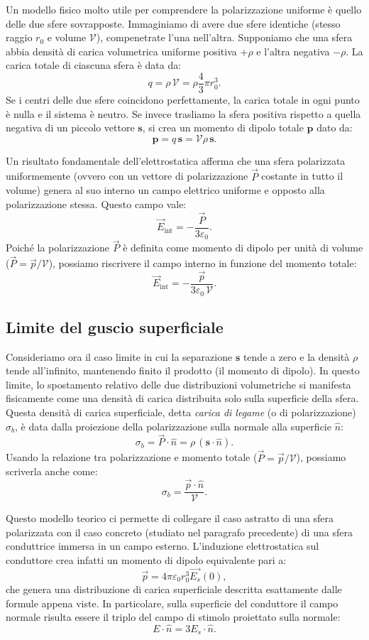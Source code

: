 \documentclass{book}
\begin{document}
Un modello fisico molto utile per comprendere la polarizzazione uniforme è quello delle due sfere sovrapposte.
Immaginiamo di avere due sfere identiche (stesso raggio $r_0$ e volume $\mathcal{V}$), compenetrate l'una nell'altra. Supponiamo che una sfera abbia densità di carica volumetrica uniforme positiva $+\rho$ e l'altra negativa $-\rho$.
La carica totale di ciascuna sfera è data da:
\[
q=\rho\,\mathcal{V}=\rho\frac{4}{3}\pi r_0^3.
\]
Se i centri delle due sfere coincidono perfettamente, la carica totale in ogni punto è nulla e il sistema è neutro. Se invece trasliamo la sfera positiva rispetto a quella negativa di un piccolo vettore $\mathbf{s}$, si crea un momento di dipolo totale $\mathbf{p}$ dato da:
\[
\mathbf{p} = q\,\mathbf{s} = \mathcal{V}\rho\,\mathbf{s}.
\]

Un risultato fondamentale dell'elettrostatica afferma che una sfera polarizzata uniformemente (ovvero con un vettore di polarizzazione $\vec{P}$ costante in tutto il volume) genera al suo interno un campo elettrico uniforme e opposto alla polarizzazione stessa. Questo campo vale:
\[
\vec{E}_{\text{int}} = -\frac{\vec{P}}{3\varepsilon_0}.
\]
Poiché la polarizzazione $\vec{P}$ è definita come momento di dipolo per unità di volume ($\vec{P} = \vec{p}/\mathcal{V}$), possiamo riscrivere il campo interno in funzione del momento totale:
\[
\vec{E}_{\text{int}} = -\frac{\vec{p}}{3\varepsilon_0\,\mathcal{V}}.
\]

\subsection*{Limite del guscio superficiale}
Consideriamo ora il caso limite in cui la separazione $\mathbf{s}$ tende a zero e la densità $\rho$ tende all'infinito, mantenendo finito il prodotto (il momento di dipolo). In questo limite, lo spostamento relativo delle due distribuzioni volumetriche si manifesta fisicamente come una densità di carica distribuita solo sulla superficie della sfera.
Questa densità di carica superficiale, detta \emph{carica di legame} (o di polarizzazione) $\sigma_b$, è data dalla proiezione della polarizzazione sulla normale alla superficie $\hat{n}$:
\[
\sigma_b = \vec{P}\cdot\hat{n} = \rho\,(\mathbf{s}\cdot\hat{n}).
\]
Usando la relazione tra polarizzazione e momento totale ($\vec{P} = \vec{p}/\mathcal{V}$), possiamo scriverla anche come:
\[
\sigma_b = \frac{\vec{p}\cdot\hat{n}}{\mathcal{V}}.
\]

Questo modello teorico ci permette di collegare il caso astratto di una sfera polarizzata con il caso concreto (studiato nel paragrafo precedente) di una sfera conduttrice immersa in un campo esterno. L'induzione elettrostatica sul conduttore crea infatti un momento di dipolo equivalente pari a:
\[
\vec{p}=4\pi\varepsilon_0 r_0^3 \vec{E_s}(0),
\]
che genera una distribuzione di carica superficiale descritta esattamente dalle formule appena viste. In particolare, sulla superficie del conduttore il campo normale risulta essere il triplo del campo di stimolo proiettato sulla normale:
\[
E \cdot \hat{n} = 3 E_s \cdot \hat{n}.
\]
\end{document}
